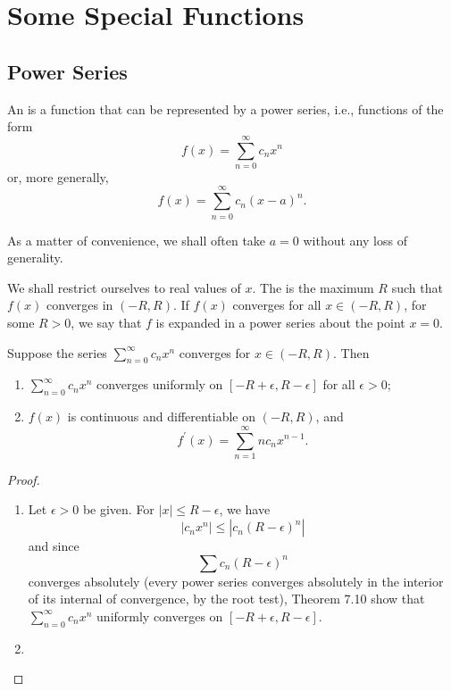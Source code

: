\chapter{Some Special Functions}\label{chap:special-functions}
\section{Power Series}
\begin{definition}
An  is a function that can be represented by a power series, i.e., functions of the form
\[f(x)=\sum_{n=0}^\infty c_n x^n\]
or, more generally,
\[f(x)=\sum_{n=0}^\infty c_n(x-a)^n.\]
\end{definition}

As a matter of convenience, we shall often take $a=0$ without any loss of generality.

We shall restrict ourselves to real values of $x$. The  is the maximum $R$ such that $f(x)$ converges in $(-R,R)$. If $f(x)$ converges for all $x\in(-R,R)$, for some $R>0$, we say that $f$ is expanded in a power series about the point $x=0$.

\begin{proposition}
Suppose the series $\displaystyle\sum_{n=0}^\infty c_nx^n$ converges for $x\in(-R,R)$. Then
\begin{enumerate}[label=(\roman*)]
\item $\displaystyle\sum_{n=0}^\infty c_nx^n$ converges uniformly on $[-R+\epsilon,R-\epsilon]$ for all $\epsilon>0$;
\item $f(x)$ is continuous and differentiable on $(-R,R)$, and 
\[f^\prime(x)=\sum_{n=1}^\infty nc_nx^{n-1}.\]
\end{enumerate}
\end{proposition}

\begin{proof} \
\begin{enumerate}[label=(\roman*)]
\item Let $\epsilon>0$ be given. For $|x|\le R-\epsilon$, we have
\[|c_nx^n|\le|c_n(R-\epsilon)^n|\]
and since
\[\sum c_n(R-\epsilon)^n\]
converges absolutely (every power series converges absolutely in the interior of its internal of convergence, by the root test), Theorem 7.10 show that $\displaystyle\sum_{n=0}^\infty c_nx^n$ uniformly converges on $[-R+\epsilon,R-\epsilon]$.

\item 
\end{enumerate}
\end{proof}

